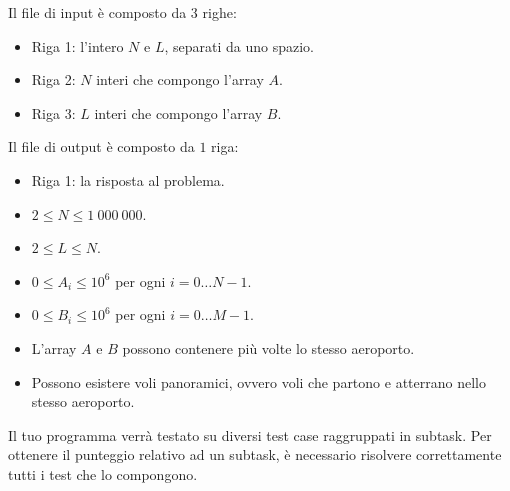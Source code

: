 Il file di input è composto da $3$ righe:
\begin{itemize}
    \item Riga 1: l'intero $N$ e $L$, separati da uno spazio.
    \item Riga 2: $N$ interi che compongo l'array $A$.
    \item Riga 3: $L$ interi che compongo l'array $B$.
\end{itemize}

Il file di output è composto da $1$ riga:
\begin{itemize}
    \item Riga 1: la risposta al problema.
\end{itemize}


\Constraints

\begin{itemize}[nolistsep, itemsep=2mm]
    \item $2 \le N \le 1\:000\:000$.
    \item $2 \le L \le N$.
    \item $0\le A_i \le 10^6$ per ogni $i = 0 \dots N-1$.
    \item $0 \le B_i \le 10^6$ per ogni $i = 0 \dots M-1$.
    \item L'array $A$ e $B$ possono contenere più volte lo stesso aeroporto.
    \item Possono esistere voli panoramici, ovvero voli che partono e atterrano nello stesso aeroporto.
\end{itemize}


\Scoring

Il tuo programma verrà testato su diversi test case raggruppati in subtask.
Per ottenere il punteggio relativo ad un subtask,
è necessario risolvere correttamente tutti i test che lo compongono.





